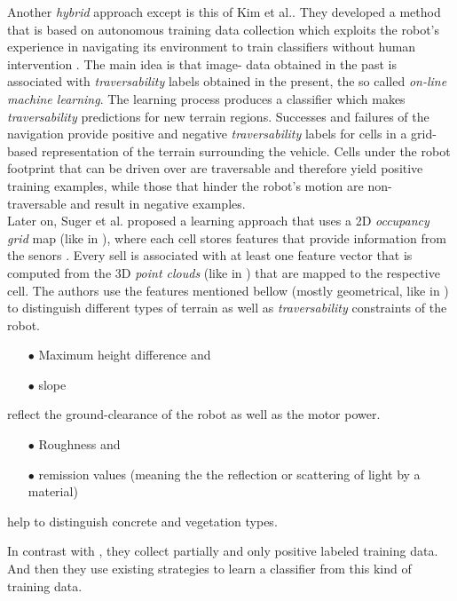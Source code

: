 \documentclass[12pt,a4paper]{report}
\newcommand{\etal}[1]{#1 et al.}
\newcommand{\term}{\textit}
\newcommand{\acronym}{\MakeUppercase}
\begin{document}
	Another \term{hybrid} approach except \cite{Shneier} is this of \etal{Kim}. They 
	developed a method that is based on autonomous training data collection which 
	exploits the robot’s experience in navigating its environment to train 
	classifiers without human intervention \cite{Kim}. The main idea is that image-
	data obtained in the past is associated with \term{traversability} labels 
	obtained in the present, the so called \term{on-line machine learning}. The 
	learning process produces a classifier which makes \term{traversability} 
	predictions for new terrain regions. Successes and failures of the navigation 
	provide positive and negative \term{traversability} labels for cells in a grid-
	based representation of the terrain surrounding the vehicle. Cells under the 
	robot footprint that can be driven over are traversable and therefore yield 
	positive training examples, while those that hinder the robot’s motion are non-
	traversable and result in negative examples.
	\\
	
	Later on, \etal{Suger} proposed a learning approach that uses a \acronym{2d} 
	\term{occupancy grid} map (like in \cite{Shneier}), where each cell stores 
	features that provide information from the senors \cite{Suger}. Every sell is 
	associated with at least one feature vector that is computed from the \acronym{3d} 
	\term{point clouds} (like in \cite{Lalonde}) that are mapped to the respective 
	cell. The authors use the features mentioned bellow (mostly geometrical, like in 
	\cite{Lalonde, Pfaff}) to distinguish different types of terrain as well as 
	\term{traversability} constraints of the robot. 
	\begin{enumerate}
		\item[$\bullet$] Maximum height difference and
		\item[$\bullet$] slope 
	\end{enumerate}
	reflect the ground-clearance of the robot as well as the motor power.
	\begin{enumerate}
		\item[$\bullet$] Roughness and
		\item[$\bullet$] remission values (meaning the the reflection or scattering 
		of light by a material) 
	\end{enumerate}
	help to distinguish concrete and vegetation types.
	\par
	In contrast with \cite{Kim}, they collect partially and only positive labeled 
	training data. And then they use existing strategies \cite{Denis, Elkan} to 
	learn a classifier from this kind of training data.
	\\
	
\end{document}
